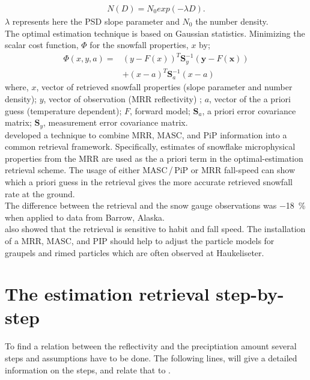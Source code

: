 \begin{align}
	N(D) = N_{0} exp(-\lambda D).
	\label{eq:PSD}
\end{align} 
$\lambda$ represents here the PSD slope parameter and $N_{0}$ the number density. 
\\
The optimal estimation technique is based on Gaussian statistics. Minimizing the scalar cost function, $\Phi$ for the snowfall properties, $x$ by; 
\begin{equation}
\begin{split}
\Phi(x,y,a) = &(y- F(x))^T \mathbf{S}_y^{-1} (\mathbf{y}-F(\mathbf{x})) \\
&+(x-a)^T \mathbf{S}_{a}^{-1} (x-a)
\end{split} \label{eq:scalar_cost_fct}
\end{equation}
where, $x$, vector of retrieved snowfall properties (slope parameter and number density); $y$, vector of observation (MRR reflectivity) ; $a$, vector of the a priori guess (temperature dependent); $F$, forward model; $\mathbf{S}_a$, a priori error covariance matrix; $\mathbf{S}_y$, measurement error covariance matrix.
\\
\cite{cooper_variational_2017} developed a technique to combine MRR, MASC, and PiP information into a common retrieval framework. Specifically, estimates of snowflake microphysical properties from the MRR are used as the a priori term in the optimal-estimation retrieval scheme. The usage of either MASC\,/\,PiP or MRR fall-speed can show which a priori guess in the retrieval gives the more accurate retrieved snowfall rate at the ground. \\
The difference between the retrieval and the snow gauge observations was \SI{-18}{\percent} when applied to data from Barrow, Alaska.\\
\cite{cooper_variational_2017} also showed that the retrieval is sensitive to habit and fall speed. The installation of a MRR, MASC, and PIP should help to adjust the particle models for graupels and rimed particles which are often observed at Haukeliseter. 

\section{The estimation retrieval step-by-step}
To find a relation between the reflectivity and the preciptiation amount several steps and assumptions have to be done. The following lines, will give a detailed information on the steps, and relate that to . 
\\
